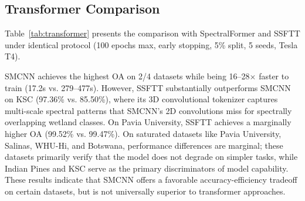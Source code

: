 \documentclass[conference]{IEEEtran}
\begin{document}
\subsection{Transformer Comparison}

Table~\ref{tab:transformer} presents the comparison with SpectralFormer and SSFTT under identical protocol (100 epochs max, early stopping, 5\% split, 5 seeds, Tesla T4).

\begin{table}[!t]
\caption{SMCNN vs. Transformer Baselines (OA \%)}
\label{tab:transformer}
\centering
{}
\end{table}

SMCNN achieves the highest OA on 2/4 datasets while being 16--28$\times$ faster to train (17.2s vs. 279--477s). However, SSFTT substantially outperforms SMCNN on KSC (97.36\% vs. 85.50\%), where its 3D convolutional tokenizer captures multi-scale spectral patterns that SMCNN's 2D convolutions miss for spectrally overlapping wetland classes. On Pavia University, SSFTT achieves a marginally higher OA (99.52\% vs. 99.47\%). On saturated datasets like Pavia University, Salinas, WHU-Hi, and Botswana, performance differences are marginal; these datasets primarily verify that the model does not degrade on simpler tasks, while Indian Pines and KSC serve as the primary discriminators of model capability. These results indicate that SMCNN offers a favorable accuracy-efficiency tradeoff on certain datasets, but is not universally superior to transformer approaches.

\end{document}
